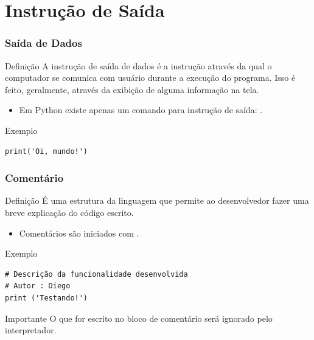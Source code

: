 \documentclass[aspectratio=169]{beamer} %
\begin{document}
\section{Instru\c cão de Saída}

\begin{frame}[fragile]
\frametitle{Saída de Dados}

\begin{block}{Definição}
	A instrução de saída de dados é a instrução através da qual o computador se comunica com usuário durante a execução do programa. Isso é feito, geralmente, através da exibição de alguma informação na tela.
\end{block}\vfill

\begin{itemize}
	\item Em Python existe apenas um comando para instrução de saída: .
\end{itemize}\vfill

\begin{exampleblock}{Exemplo}
\begin{lstlisting}
print('Oi, mundo!')
\end{lstlisting}
\end{exampleblock}
\end{frame}

\begin{frame}[fragile]
\frametitle{Comentário}

\begin{block}{Definição}
É uma estrutura da linguagem que permite ao desenvolvedor fazer uma breve explicação do código escrito.
\end{block}\vfill

\begin{itemize}
	\item Comentários são iniciados com \structure{\#}.
\end{itemize}\vfill

\begin{exampleblock}{Exemplo}
	\begin{lstlisting}
# Descrição da funcionalidade desenvolvida
# Autor : Diego
print ('Testando!')
	\end{lstlisting}
\end{exampleblock}\vfill

\begin{alertblock}{Importante}
O que for escrito no bloco de comentário será ignorado pelo interpretador.
\end{alertblock}
\end{frame}
\end{document}

